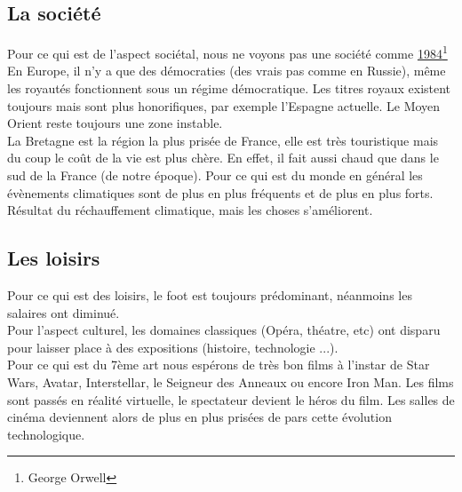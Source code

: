 {\subsection{La société}

Pour ce qui est de l'aspect sociétal, nous ne voyons pas une société comme \underline{1984}\footnote{George Orwell}\\
En Europe, il n'y a que des démocraties (des vrais pas comme en Russie), même les royautés fonctionnent sous un régime démocratique. Les titres royaux existent toujours mais sont plus honorifiques, par exemple l'Espagne actuelle. 
Le Moyen Orient reste toujours une zone instable.\\


La Bretagne est la région la plus prisée de France, elle est très touristique mais du coup le coût de la vie est plus chère. En effet, il fait aussi chaud que dans le sud de la France (de notre époque). Pour ce qui est du monde en général les évènements climatiques sont de plus en plus fréquents et de plus en plus forts. Résultat du réchauffement climatique, mais les choses s'améliorent.

\subsection{Les loisirs}

Pour ce qui est des loisirs, le foot est toujours prédominant, néanmoins les salaires ont diminué.\\ 
Pour l'aspect culturel, les domaines classiques (Opéra, théatre, etc) ont disparu pour laisser place à des expositions (histoire, technologie ...).\\

Pour ce qui est du 7ème art nous espérons de très bon films à l'instar de Star Wars, Avatar, Interstellar, le Seigneur des Anneaux ou encore Iron Man. Les films sont passés en réalité virtuelle, le spectateur devient le héros du film. Les salles de cinéma deviennent alors de plus en plus prisées de pars cette évolution technologique.

\newpage
}
